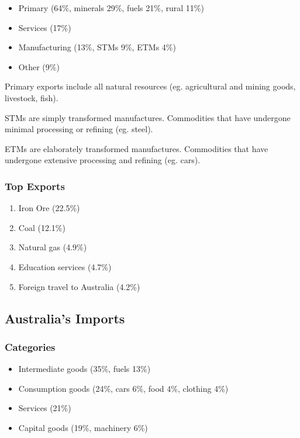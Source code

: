 \documentclass[a4paper,11pt]{article}
\begin{document}
\begin{itemize}
\item Primary (64\%, minerals 29\%, fuels 21\%, rural 11\%)
\item Services (17\%)
\item Manufacturing (13\%, STMs 9\%, ETMs 4\%)
\item Other (9\%)
\end{itemize}

Primary exports include all natural resources (eg. agricultural and mining
goods, livestock, fish).

STMs are simply transformed manufactures. Commodities that have undergone
minimal processing or refining (eg. steel).

ETMs are elaborately transformed manufactures. Commodities that have undergone
extensive processing and refining (eg. cars).


\subsubsection{Top Exports}

\begin{enumerate}
\item Iron Ore (22.5\%)
\item Coal (12.1\%)
\item Natural gas (4.9\%)
\item Education services (4.7\%)
\item Foreign travel to Australia (4.2\%)
\end{enumerate}


\subsection{Australia's Imports}

\subsubsection{Categories}

\begin{itemize}
\item Intermediate goods (35\%, fuels 13\%)
\item Consumption goods (24\%, cars 6\%, food 4\%, clothing 4\%)
\item Services (21\%)
\item Capital goods (19\%, machinery 6\%)
\end{itemize}
\end{document}
